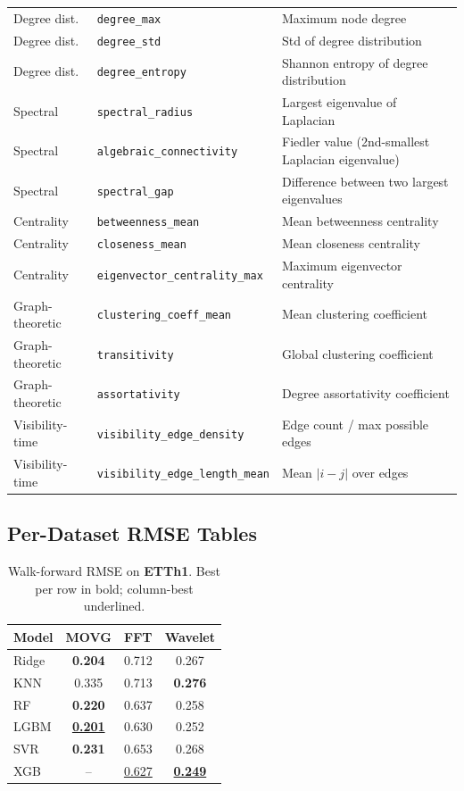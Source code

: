 \documentclass[a4paper,12pt]{article}
\begin{document}
\begin{table}[ht]
\begin{tabular}{llp{6.5cm}}
\midrule
Degree dist. & \texttt{degree\_max} & Maximum node degree \\
Degree dist. & \texttt{degree\_std} & Std of degree distribution \\
Degree dist. & \texttt{degree\_entropy} & Shannon entropy of degree distribution \\
\midrule
Spectral & \texttt{spectral\_radius} & Largest eigenvalue of Laplacian \\
Spectral & \texttt{algebraic\_connectivity} & Fiedler value (2nd-smallest Laplacian eigenvalue) \\
Spectral & \texttt{spectral\_gap} & Difference between two largest eigenvalues \\
\midrule
Centrality & \texttt{betweenness\_mean} & Mean betweenness centrality \\
Centrality & \texttt{closeness\_mean} & Mean closeness centrality \\
Centrality & \texttt{eigenvector\_centrality\_max} & Maximum eigenvector centrality \\
\midrule
Graph-theoretic & \texttt{clustering\_coeff\_mean} & Mean clustering coefficient \\
Graph-theoretic & \texttt{transitivity} & Global clustering coefficient \\
Graph-theoretic & \texttt{assortativity} & Degree assortativity coefficient \\
\midrule
Visibility-time & \texttt{visibility\_edge\_density} & Edge count / max possible edges \\
Visibility-time & \texttt{visibility\_edge\_length\_mean} & Mean $|i - j|$ over edges \\
\bottomrule
\end{tabular}
\end{table}

\subsection{Per-Dataset RMSE Tables}

\begin{table}[ht]
\centering
\caption{Walk-forward RMSE on \textbf{ETTh1}. Best per row in bold; column-best underlined.}
\label{tab:per_ds_etth1_oiltemp}
\begin{tabular}{lccc}
\toprule
Model & MOVG & FFT & Wavelet \\
\midrule
Ridge & \textbf{0.204} & 0.712 & 0.267 \\
KNN & 0.335 & 0.713 & \textbf{0.276} \\
RF & \textbf{0.220} & 0.637 & 0.258 \\
LGBM & \underline{\textbf{0.201}} & 0.630 & 0.252 \\
SVR & \textbf{0.231} & 0.653 & 0.268 \\
XGB & -- & \underline{0.627} & \underline{\textbf{0.249}} \\
\bottomrule
\end{tabular}
\end{table}
\end{document}

